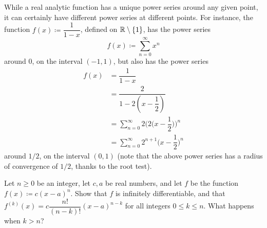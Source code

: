 \begin{rmk}\label{4.2.13}
  While a real analytic function has a unique power series around any given point, it can certainly have different power series at different points.
  For instance, the function \(f(x) \coloneqq \dfrac{1}{1 - x}\), defined on \(\mathbb{R} \setminus \{1\}\), has the power series
  \[
    f(x) \coloneqq \sum_{n = 0}^\infty x^n
  \]
  around \(0\), on the interval \((-1, 1)\), but also has the power series
  \begin{align*}
    f(x) & = \dfrac{1}{1 - x}                                                  \\
         & = \dfrac{2}{1 - 2(x - \dfrac{1}{2})}                                \\
         & = \sum_{n = 0}^\infty 2 \bigg(2\bigg(x - \dfrac{1}{2}\bigg)\bigg)^n \\
         & = \sum_{n = 0}^\infty 2^{n + 1} \bigg(x - \dfrac{1}{2}\bigg)^n
  \end{align*}
  around \(1 / 2\), on the interval \((0, 1)\)
  (note that the above power series has a radius of convergence of \(1 / 2\), thanks to the root test).
\end{rmk}

\exercisesection

\begin{ex}\label{ex:4.2.1}
  Let \(n \geq 0\) be an integer, let \(c, a\) be real numbers, and let \(f\) be the function \(f(x) \coloneqq c (x - a)^n\).
  Show that \(f\) is infinitely differentiable, and that \(f^{(k)}(x) = c \dfrac{n!}{(n - k)!} (x - a)^{n - k}\) for all integers \(0 \leq k \leq n\).
  What happens when \(k > n\)?
\end{ex}

